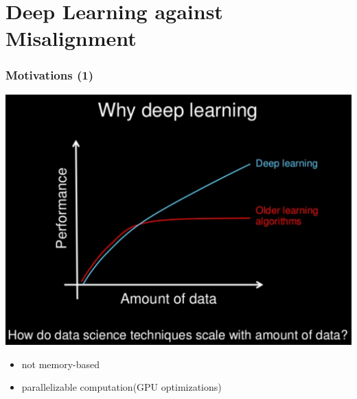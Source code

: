 \section{Deep Learning against Misalignment}
\begin{frame}
\frametitle{Motivations (1)}
\includegraphics[width=.5\textwidth]{figures/whydeeplearning.png} 
\begin{itemize}
\item not memory-based
\item parallelizable computation(GPU optimizations)
\end{itemize}

\end{frame}

